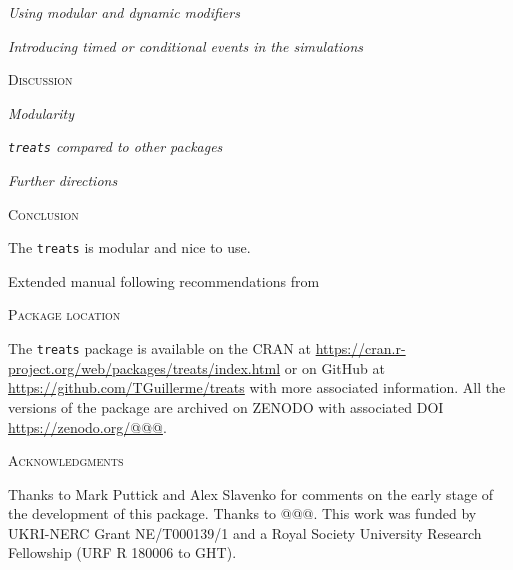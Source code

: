\documentclass[12pt,letterpaper]{article}
\renewcommand{\section}[1]{%
\bigskip
\begin{center}
\begin{Large}
\normalfont\scshape #1
\medskip
\end{Large}
\end{center}}
\renewcommand{\subsection}[1]{%
\bigskip
\begin{center}
\begin{large}
\normalfont\itshape #1
\end{large}
\end{center}}
\newcommand{\treats}{\texttt{treats} }
\begin{document}



\subsection{Using modular and dynamic modifiers}


\subsection{Introducing timed or conditional events in the simulations}


\section{Discussion}

\subsection{Modularity}

\subsection{\treats compared to other packages}

\subsection{Further directions}


\section{Conclusion}
The \treats is modular and nice to use.

Extended manual following recommendations from \cite{cooper2016dark}


\section{Package location}
The \treats package is available on the CRAN at \url{https://cran.r-project.org/web/packages/treats/index.html} or on GitHub at \url{https://github.com/TGuillerme/treats} with more associated information.
All the versions of the package are archived on ZENODO with associated DOI \url{https://zenodo.org/@@@}.

\section{Acknowledgments}
Thanks to Mark Puttick and Alex Slavenko for comments on the early stage of the development of this package. Thanks to @@@. This work was funded by UKRI-NERC Grant NE/T000139/1 and a Royal Society University Research Fellowship (URF R 180006 to GHT).



\end{document}
